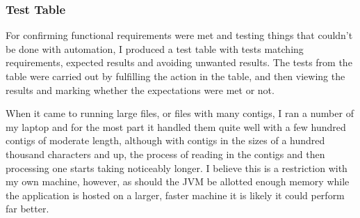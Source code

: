 \subsubsection{Test Table}
For confirming functional requirements were met and testing things that couldn't be done with automation, I produced a test table with tests matching requirements, expected results and avoiding unwanted results. The tests from the table were carried out by fulfilling the action in the table, and then viewing the results and marking whether the expectations were met or not.


When it came to running large files, or files with many contigs, I ran a number of my laptop and for the most part it handled them quite well with a few hundred contigs of moderate length, although with contigs in the sizes of a hundred thousand characters and up, the process of reading in the contigs and then processing one starts taking noticeably longer. I believe this is a restriction with my own machine, however, as should the JVM be allotted enough memory while the application is hosted on a larger, faster machine it is likely it could perform far better.
